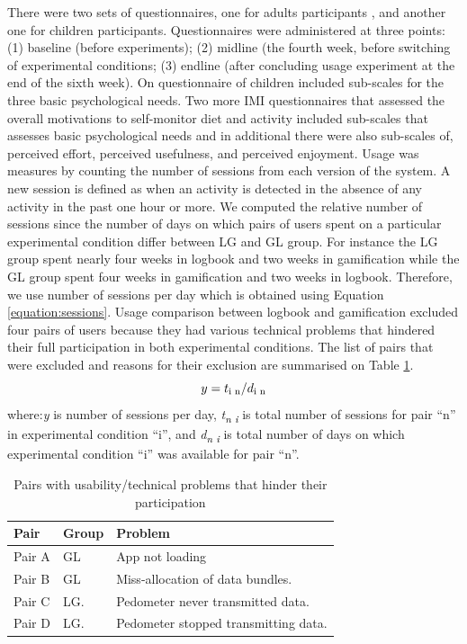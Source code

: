 \documentclass{sig-alternate}
\def\SB#1{\textsubscript{\textcolor{black}{#1}}}
\begin{document}
There were two sets of questionnaires, one for adults participants , and another one for children participants. Questionnaires were administered at three points: (1) baseline (before experiments); (2) midline (the fourth week, before switching of experimental conditions; (3) endline (after concluding usage experiment at the end of the sixth week).\newline
On questionnaire of children included sub-scales for the three basic psychological needs. Two more IMI questionnaires that assessed the overall motivations to self-monitor diet and activity included sub-scales that assesses basic psychological needs and in additional there were also sub-scales of, perceived effort, perceived usefulness, and perceived enjoyment.\newline 
Usage was measures by counting the number of sessions from each version of the system. A new session is defined as when an activity is detected in the absence of any activity in the past one hour or more. We computed the relative number of sessions since the number of days on which pairs of users spent on a particular experimental condition differ between LG and GL group. For instance the LG group spent nearly four weeks in logbook and two weeks in gamification while the GL group spent four weeks in gamification and two weeks in logbook. Therefore, we use number of sessions per day which is obtained using Equation \ref{equation:sessions}. Usage comparison between logbook and gamification excluded four pairs of users because they had various technical problems that hindered their full participation in both experimental conditions. The list of pairs that were excluded and reasons for their exclusion are summarised on Table \ref{table:usageproblems}.
\begin{equation}
\label{equation:sessions}
y=t\SB{i n}/d\SB{i n}
\end{equation}
where:\emph{y} is number of sessions per day, \emph{t\SB{n i}} is total number of sessions for pair ``n'' in experimental condition ``i'', and \emph{d\SB{n i}} is total number of days on which experimental condition ``i'' was available for pair ``n''.
\begin{table}[h!]
  \begin{center}
    \caption{Pairs with usability/technical problems that hinder their participation}
    \label{table:usageproblems}
	\begin{tabular}{|p{1cm}|p{0.8cm}|p{5cm}|}
		\hline
		Pair&Group&Problem\\
		\hline
		Pair A&GL &App not loading\\
		\hline
		Pair B&GL& Miss-allocation of data bundles.\\
		\hline
		Pair C & LG.& Pedometer never transmitted data.\\
		\hline
		Pair D & LG.& Pedometer stopped transmitting data.\\
	\hline
	\end{tabular}
  \end{center}
\end{table}
\end{document}
